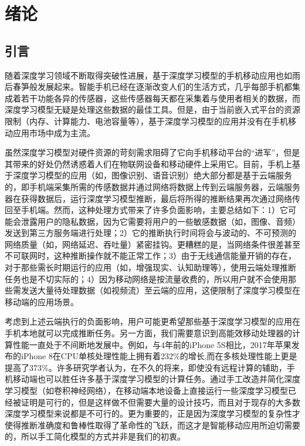 \chapter{绪论}

\section{引言}
随着深度学习\cite{lecun2015deep}领域不断取得突破性进展，基于深度学习模型的手机移动应用也如雨后春笋般发展起来。智能手机已经在逐渐改变人们的生活方式，几乎每部手机都集成着若干功能各异的传感器，这些传感器每天都在采集着与使用者相关的数据，而深度学习模型无疑是处理这些数据的最佳工具。但是，由于当前嵌入式平台的资源限制（内存、计算能力、电池容量等），基于深度学习模型的应用并没有在手机移动应用市场中成为主流。

虽然深度学习模型对硬件资源的苛刻需求阻碍了它向手机移动平台的“进军”，但是其带来的好处仍然诱惑着人们在物联网设备和移动硬件上采用它。目前，手机上基于深度学习模型的应用（如，图像识别、语音识别）绝大部分都是基于云端服务的，即手机端采集所需的传感数据并通过网络将数据上传到云端服务器，云端服务器在获得数据后，运行深度学习模型推断，最后将所得的推断结果再次通过网络传回至手机端。然而，这种处理方式带来了许多负面影响，主要总结如下：1）它可能会泄露用户的隐私数据，因为它需要将用户的一些敏感数据（如，图像、音频）发送到第三方服务端进行处理；2）它的推断执行时间将会与波动的、不可预测的网络质量（如，网络延迟、吞吐量）紧密挂钩。更糟糕的是，当网络条件很差甚至不可联网时，这种推断操作就不能正常工作；3）由于无线通信能量开销的存在，对于那些需长时期运行的应用（如，增强现实、认知助理等），使用云端处理推断任务也是不切实际的；4）因为移动网络是按流量收费的，所以用户就不会使用那些需发送大量待处理数据（如视频流）至云端的应用，这便限制了深度学习模型在移动端的应用场景。

考虑到上述云端执行的负面影响，用户可能更希望那些基于深度学习模型的应用在手机本地就可以完成推断任务。另一方面，我们需要意识到高能效移动处理器的计算性能一直处于不间断地发展中。例如，与4年前的iPhone 5S相比，2017年苹果发布的iPhone 8在CPU单核处理性能上拥有着232\%的增长,而在多核处理性能上更是提高了373\%。许多研究学者认为，在不久的将来，即使没有远程计算的辅助，手机移动端也可以胜任许多基于深度学习模型的计算任务。通过手工改造并简化深度学习模型（如卷积神经网络\cite{krizhevsky2012imagenet}），在移动端本地设备上直接运行一些深度学习模型已经被证明是可行的，但是这样做不但需要大量的设计技巧，而且对于现存的大多数深度学习模型来说都是不可行的。更为重要的，正是因为深度学习模型的复杂性才使得推断准确度和鲁棒性取得了革命性的飞跃，而这才是智能移动应用所迫切需要的，所以手工简化模型的方式并非是我们的初衷。

